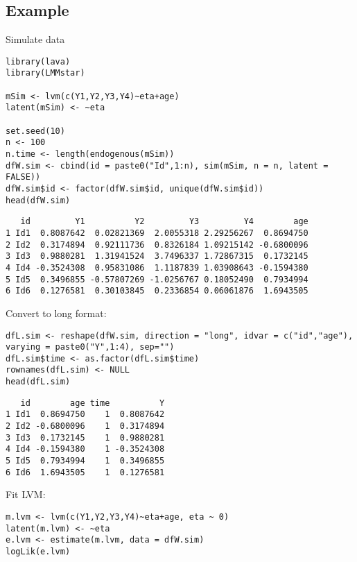 \documentclass[12pt]{article}
\begin{document}
\clearpage

\subsection{Example}
\label{sec:org610e4e1}

Simulate data
\lstset{language=r,label= ,caption= ,captionpos=b,numbers=none}
\begin{lstlisting}
library(lava)
library(LMMstar)

mSim <- lvm(c(Y1,Y2,Y3,Y4)~eta+age)
latent(mSim) <- ~eta

set.seed(10)
n <- 100
n.time <- length(endogenous(mSim))
dfW.sim <- cbind(id = paste0("Id",1:n), sim(mSim, n = n, latent = FALSE))
dfW.sim$id <- factor(dfW.sim$id, unique(dfW.sim$id))
head(dfW.sim)
\end{lstlisting}

\begin{verbatim}
   id         Y1          Y2         Y3         Y4        age
1 Id1  0.8087642  0.02821369  2.0055318 2.29256267  0.8694750
2 Id2  0.3174894  0.92111736  0.8326184 1.09215142 -0.6800096
3 Id3  0.9880281  1.31941524  3.7496337 1.72867315  0.1732145
4 Id4 -0.3524308  0.95831086  1.1187839 1.03908643 -0.1594380
5 Id5  0.3496855 -0.57807269 -1.0256767 0.18052490  0.7934994
6 Id6  0.1276581  0.30103845  0.2336854 0.06061876  1.6943505
\end{verbatim}


Convert to long format:
\lstset{language=r,label= ,caption= ,captionpos=b,numbers=none}
\begin{lstlisting}
dfL.sim <- reshape(dfW.sim, direction = "long", idvar = c("id","age"), varying = paste0("Y",1:4), sep="")
dfL.sim$time <- as.factor(dfL.sim$time)
rownames(dfL.sim) <- NULL
head(dfL.sim)
\end{lstlisting}

\begin{verbatim}
   id        age time          Y
1 Id1  0.8694750    1  0.8087642
2 Id2 -0.6800096    1  0.3174894
3 Id3  0.1732145    1  0.9880281
4 Id4 -0.1594380    1 -0.3524308
5 Id5  0.7934994    1  0.3496855
6 Id6  1.6943505    1  0.1276581
\end{verbatim}


Fit LVM:
\lstset{language=r,label= ,caption= ,captionpos=b,numbers=none}
\begin{lstlisting}
m.lvm <- lvm(c(Y1,Y2,Y3,Y4)~eta+age, eta ~ 0)
latent(m.lvm) <- ~eta
e.lvm <- estimate(m.lvm, data = dfW.sim)
logLik(e.lvm)
\end{lstlisting}
\end{document}
